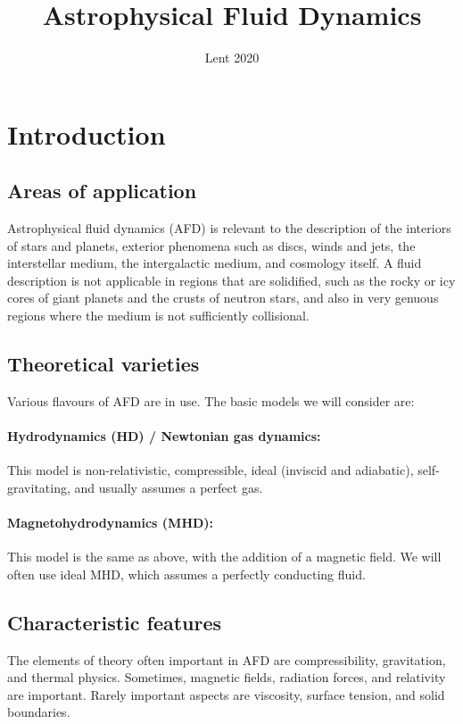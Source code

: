 \documentclass{jknotes}
\begin{document}
\title{Astrophysical Fluid Dynamics}
\date{Lent 2020}

\maketitle
\suggestionsspiel
\tableofcontents

\section{Introduction}
\subsection{Areas of application}
Astrophysical fluid dynamics (AFD) is relevant to the description of the interiors
of stars and planets, exterior phenomena such as discs, winds and jets, the
interstellar medium, the intergalactic medium, and cosmology itself. A fluid
description is not applicable in regions that are solidified, such as the
rocky or icy cores of giant planets and the crusts of neutron stars, and also
in very genuous regions where the medium is not sufficiently collisional.

\subsection{Theoretical varieties}
Various flavours of AFD are in use. The basic models we will consider are:
\paragraph{Hydrodynamics (HD) / Newtonian gas dynamics:}
This model is non-relativistic, compressible, ideal (inviscid and adiabatic),
self-gravitating, and usually assumes a perfect gas.
\paragraph{Magnetohydrodynamics (MHD):}
This model is the same as above, with the addition of a magnetic field. We
will often use ideal MHD, which assumes a perfectly conducting fluid.

\subsection{Characteristic features}
The elements of theory often important in AFD are compressibility,
gravitation, and thermal physics. Sometimes, magnetic fields, radiation
forces, and relativity are important. Rarely important aspects are viscosity,
surface tension, and solid boundaries.
\end{document}
